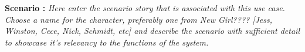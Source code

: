 \begin{flushleft}
\textbf{Scenario :} 
\textit{Here enter the scenario story that is associated with this use case. Choose a name for the character, preferably one from New Girl???? [Jess, Winston, Cece, Nick, Schmidt, etc] and describe the scenario with sufficient detail to showcase it's relevancy to the functions of the system.}
\end{flushleft}